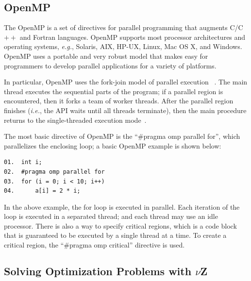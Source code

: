 \subsection{OpenMP}
\label{OpenMP}

The OpenMP is a set of directives for parallel programming that augments C/C$++$ and Fortran languages. OpenMP supports most processor architectures and operating systems, {\it e.g.}, Solaris, AIX, HP-UX, Linux, Mac OS X, and Windows. OpenMP uses a portable and very robust model that makes easy for programmers to develop parallel applications for a variety of platforms. 

In particular, OpenMP uses the fork-join model of parallel execution ~\cite{OpenMP1998}. The main thread executes the sequential parts of the program; if a parallel region is encountered, then it forks a team of worker threads. After the parallel region finishes ({\it i.e.}, the API waits until all threads terminate), then the main procedure returns to the single-threaded execution mode~\cite{Wu2014}.

The most basic directive of OpenMP is the ``\#pragma omp parallel for'', which parallelizes the enclosing loop; a basic OpenMP example is shown below:

\begin{lstlisting}[caption=OpenMP basic sample]
01.  int i;
02.  #pragma omp parallel for
03.  for (i = 0; i < 10; i++)
04.      a[i] = 2 * i;
\end{lstlisting}

In the above example, the for loop is executed in parallel. Each iteration of the loop is executed in a separated thread; and each thread may use an idle processor. There is also a way to specify critical regions, which is a code block that is guaranteed to be executed by a single thread at a time. To create a critical region, the ``\#pragma omp critical'' directive is used.

\subsection{Solving Optimization Problems with $\nu$Z}
\label{Optimization-with-Vz}



